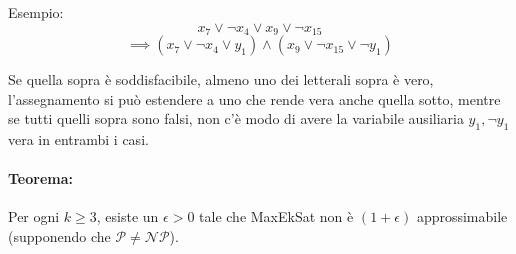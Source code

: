 Esempio: 
$$ x_7 \vee \neg x_4 \vee x_9 \vee \neg x_{15} $$
$$ \implies (x_7 \vee \neg x_4 \vee y_1) \wedge (x_9 \vee \neg x_{15} \vee \neg y_1) $$

Se quella sopra è soddisfacibile, almeno uno dei letterali sopra è vero, l'assegnamento si può estendere a uno che rende vera anche quella sotto, mentre se tutti quelli sopra sono falsi, non c'è modo di avere la variabile ausiliaria $y_1, \neg y_1$ vera in entrambi i casi.\\

\paragraph{Teorema:} Per ogni $k \geq 3$, esiste un $\epsilon > 0$ tale che MaxEkSat non è $(1+\epsilon)$ approssimabile (supponendo che $\mathcal{P} \neq \mathcal{NP}$).\\

